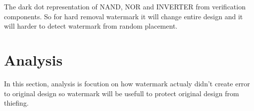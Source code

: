 \documentclass[10pt,journal,compsoc]{IEEEtran}
\begin{document}


The dark dot representation of NAND, NOR and INVERTER from verification components. So for hard removal watermark it will change entire design and it will harder to detect watermark from random placement.

\section{Analysis}
In this section, analysis is focution on how watermark actualy didn't create error to original design
so watermark will be usefull to protect original design from thiefing.
\end{document}
